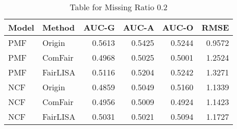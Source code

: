 \begin{table}
\centering
\caption{Table for Missing Ratio 0.2}
\label{tab:missing_0.2}
\begin{tabular}{llrrrr}
\toprule
Model &   Method &  AUC-G &  AUC-A &  AUC-O &   RMSE \\
\midrule
  PMF &   Origin & 0.5613 & 0.5425 & 0.5244 & 0.9572 \\
  PMF &  ComFair & 0.4968 & 0.5025 & 0.5001 & 1.2524 \\
  PMF & FairLISA & 0.5116 & 0.5204 & 0.5242 & 1.3271 \\
  NCF &   Origin & 0.4859 & 0.5049 & 0.5160 & 1.1339 \\
  NCF &  ComFair & 0.4956 & 0.5009 & 0.4924 & 1.1423 \\
  NCF & FairLISA & 0.5031 & 0.5021 & 0.5094 & 1.1727 \\
\bottomrule
\end{tabular}
\end{table}
